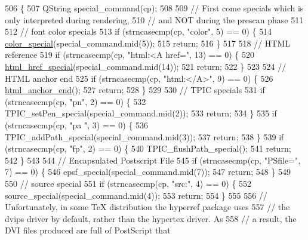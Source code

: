 \begin{DoxyCode}
506 \{
507   QString special\_command(cp);
508 
509   \textcolor{comment}{// First come specials which is only interpreted during rendering,}
510   \textcolor{comment}{// and NOT during the prescan phase}
511 
512   \textcolor{comment}{// font color specials}
513   \textcolor{keywordflow}{if} (strncasecmp(cp, \textcolor{stringliteral}{"color"}, 5) == 0) \{
514     \hyperlink{classdviRenderer_ad233897e0a40650628ba6fc8bd3d87b0}{color\_special}(special\_command.mid(5));
515     \textcolor{keywordflow}{return};
516   \}
517 
518   \textcolor{comment}{// HTML reference}
519   \textcolor{keywordflow}{if} (strncasecmp(cp, \textcolor{stringliteral}{"html:<A href="}, 13) == 0) \{
520     \hyperlink{classdviRenderer_a2dfcf48566f5cb649c8110d3c79dc945}{html\_href\_special}(special\_command.mid(14));
521     \textcolor{keywordflow}{return};
522   \}
523 
524   \textcolor{comment}{// HTML anchor end}
525   \textcolor{keywordflow}{if} (strncasecmp(cp, \textcolor{stringliteral}{"html:</A>"}, 9) == 0) \{
526     \hyperlink{classdviRenderer_a3967eeda01307c73467bfc47465cde6c}{html\_anchor\_end}();
527     \textcolor{keywordflow}{return};
528   \}
529 
530   \textcolor{comment}{// TPIC specials}
531   \textcolor{keywordflow}{if} (strncasecmp(cp, \textcolor{stringliteral}{"pn"}, 2) == 0) \{
532     TPIC\_setPen\_special(special\_command.mid(2));
533     \textcolor{keywordflow}{return};
534   \}
535   \textcolor{keywordflow}{if} (strncasecmp(cp, \textcolor{stringliteral}{"pa "}, 3) == 0) \{
536     TPIC\_addPath\_special(special\_command.mid(3));
537     \textcolor{keywordflow}{return};
538   \}
539   \textcolor{keywordflow}{if} (strncasecmp(cp, \textcolor{stringliteral}{"fp"}, 2) == 0) \{
540     TPIC\_flushPath\_special();
541     \textcolor{keywordflow}{return};
542   \}
543 
544   \textcolor{comment}{// Encapsulated Postscript File}
545   \textcolor{keywordflow}{if} (strncasecmp(cp, \textcolor{stringliteral}{"PSfile="}, 7) == 0) \{
546     epsf\_special(special\_command.mid(7));
547     \textcolor{keywordflow}{return};
548   \}
549 
550   \textcolor{comment}{// source special}
551   \textcolor{keywordflow}{if} (strncasecmp(cp, \textcolor{stringliteral}{"src:"}, 4) == 0) \{
552     source\_special(special\_command.mid(4));
553     \textcolor{keywordflow}{return};
554   \}
555 
556   \textcolor{comment}{// Unfortunately, in some TeX distribution the hyperref package uses}
557   \textcolor{comment}{// the dvips driver by default, rather than the hypertex driver. As}
558   \textcolor{comment}{// a result, the DVI files produced are full of PostScript that}

\end{DoxyCode}
